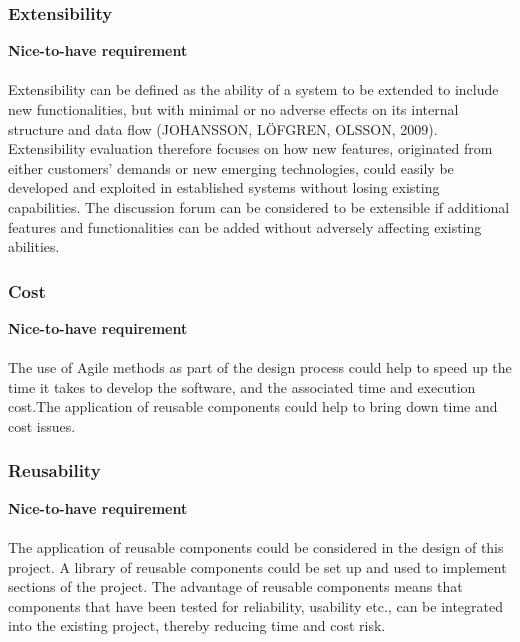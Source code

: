 \documentclass[a4paper]{article}
\begin{document}
\subsubsection{Extensibility}
\textbf{Nice-to-have requirement}
\\
\\Extensibility can be defined as the ability of a system to be extended to include new functionalities, but with minimal or no adverse effects on its internal structure and data flow (JOHANSSON, LÖFGREN, OLSSON, 2009).  Extensibility evaluation therefore focuses on how new features, originated from either customers’ demands or new emerging technologies, could easily be developed and exploited in established systems without losing existing capabilities. The discussion forum can be considered to be extensible if additional features and functionalities can be added without adversely affecting existing abilities.       
                           

\subsubsection{Cost}
\textbf{Nice-to-have requirement}
\\
\\The use of Agile methods as part of the design process could help to speed up the time it takes to develop the software, and the associated time and execution cost.The application of reusable components could help to bring down time and cost issues. 

\subsubsection{Reusability }
\textbf{Nice-to-have requirement}
\\
\\The application of reusable components could be considered in the design of this project. A library of reusable components could be set up and used to implement sections of the project. The advantage of reusable components means that components that have been tested for reliability, usability etc., can be integrated into the existing project, thereby reducing time and cost risk.
\end{document}
